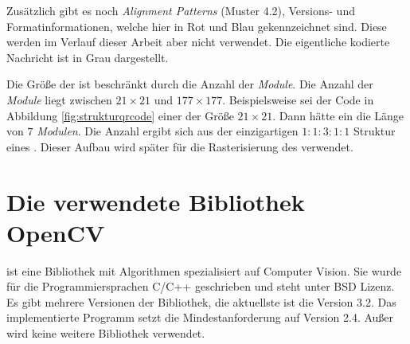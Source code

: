 Zusätzlich gibt es noch \emph{Alignment Patterns} (Muster 4.2), Versions- und Formatinformationen, welche hier in Rot und Blau gekennzeichnet sind. Diese werden im Verlauf dieser Arbeit aber nicht verwendet. Die eigentliche kodierte Nachricht ist in Grau dargestellt.

Die Größe der \QRCodes ist beschränkt durch die Anzahl der \emph{Module}. Die Anzahl der \emph{Module} liegt zwischen $21 \times 21$ und $177 \times 177$. Beispielsweise sei der Code in Abbildung \ref{fig:strukturqrcode} einer der Größe $21 \times 21$. Dann hätte ein \emph{\fp} die Länge von $7$ \emph{Modulen}. Die Anzahl ergibt sich aus der einzigartigen $1:1:3:1:1$ Struktur eines \emph{\fps}. Dieser Aufbau wird später für die Rasterisierung des \QRCodes verwendet.

\section{Die verwendete Bibliothek OpenCV}
\OpenCV\cite{opencv} ist eine Bibliothek mit Algorithmen spezialisiert auf \glqq Computer Vision\grqq . Sie wurde für die Programmiersprachen C/C++ geschrieben und steht unter BSD Lizenz. Es gibt mehrere Versionen der Bibliothek, die aktuellste ist die Version 3.2. Das implementierte Programm setzt die Mindestanforderung auf Version 2.4. Außer \OpenCV wird keine weitere Bibliothek verwendet.